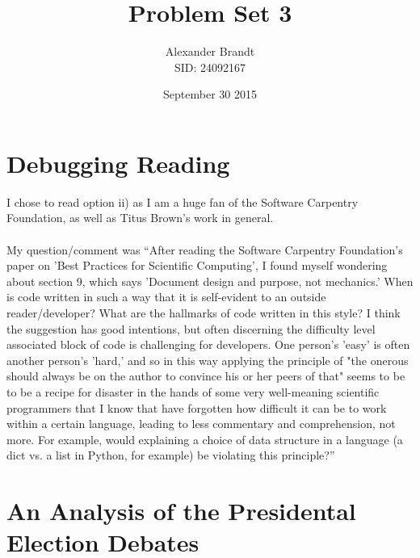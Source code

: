 \documentclass{article}\usepackage[]{graphicx}\usepackage[]{color}
\title{Problem Set 3}
\author{Alexander Brandt\\SID: 24092167}
\date{September 30 2015}
\begin{document}
\maketitle

\section{Debugging Reading}

I chose to read option ii) as I am a huge fan of the Software Carpentry Foundation, as well as Titus Brown's work in general.\\\\
My question/comment was ``After reading the Software Carpentry Foundation's paper on 'Best Practices for Scientific Computing', I found myself wondering about section 9, which says 'Document design and purpose, not mechanics.'  When is code written in such a way that it is self-evident to an outside reader/developer?  What are the hallmarks of code written in this style?  I think the suggestion has good intentions, but often discerning the difficulty level associated block of code is challenging for developers.  One person's 'easy' is often another person's 'hard,' and so in this way applying the principle of "the onerous should always be on the author to convince his or her peers of that" seems to be to be a recipe for disaster in the hands of some very well-meaning scientific programmers that I know that have forgotten how difficult it can be to work within a certain language, leading to less commentary and comprehension, not more.  For example, would explaining a choice of data structure in a language (a dict vs. a list in Python, for example) be violating this principle?''


\section{An Analysis of the Presidental Election Debates}
\end{document}
